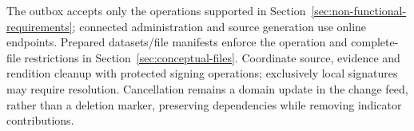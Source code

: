 The outbox accepts only the operations supported in
Section~\ref{sec:non-functional-requirements}; connected administration and source
generation use online endpoints. Prepared datasets/file manifests enforce the
operation and complete-file restrictions in Section~\ref{sec:conceptual-files}.
Coordinate source, evidence and rendition cleanup with protected signing operations;
exclusively local signatures may require  resolution.
Cancellation remains a domain update in the change feed, rather than a deletion
marker, preserving dependencies while removing indicator contributions.
